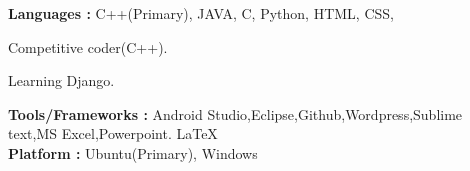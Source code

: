 
\textbf{Languages :}  C++(Primary), JAVA, C, Python, HTML, CSS, \\
{
      \begin{cvitems}
        \item {Competitive coder(C++).}
        \item {Learning Django.}
      \end{cvitems}
    }
\textbf{Tools/Frameworks :} Android Studio,Eclipse,Github,Wordpress,Sublime text,MS Excel,Powerpoint. \LaTeX\\
\textbf{Platform :} Ubuntu(Primary), Windows